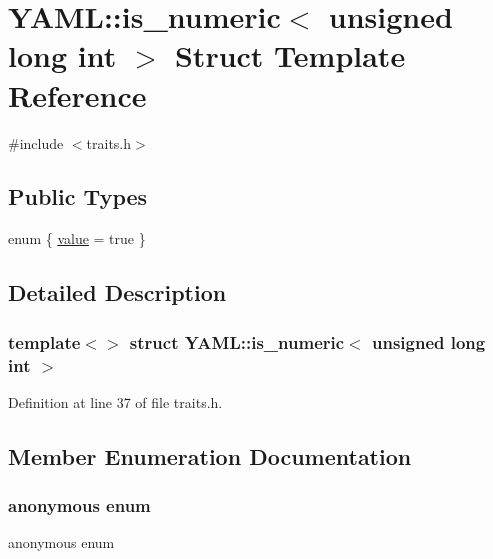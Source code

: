 \hypertarget{struct_y_a_m_l_1_1is__numeric_3_01unsigned_01long_01int_01_4}{}\section{Y\+A\+ML\+::is\+\_\+numeric$<$ unsigned long int $>$ Struct Template Reference}
\label{struct_y_a_m_l_1_1is__numeric_3_01unsigned_01long_01int_01_4}


{\ttfamily \#include $<$traits.\+h$>$}

\subsection*{Public Types}
\begin{DoxyCompactItemize}
\item 
enum \{ \mbox{\hyperlink{struct_y_a_m_l_1_1is__numeric_3_01unsigned_01long_01int_01_4_a56970b4f0dc45b35c0f8082b86378fc0abd6a2d5f9fb347e2afa3e1a3ba2f89d6}{value}} = true
 \}
\end{DoxyCompactItemize}


\subsection{Detailed Description}
\subsubsection*{template$<$$>$\newline
struct Y\+A\+M\+L\+::is\+\_\+numeric$<$ unsigned long int $>$}



Definition at line 37 of file traits.\+h.



\subsection{Member Enumeration Documentation}
\mbox{\label{struct_y_a_m_l_1_1is__numeric_3_01unsigned_01long_01int_01_4_a56970b4f0dc45b35c0f8082b86378fc0}} 
\subsubsection{\texorpdfstring{anonymous enum}{anonymous enum}}
{\footnotesize\ttfamily anonymous enum}

